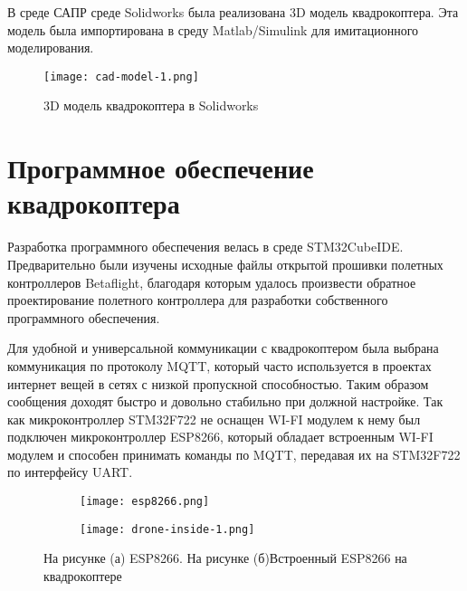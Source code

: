 В среде САПР среде Solidworks была реализована 3D модель квадрокоптера. Эта модель была
импортирована в среду Matlab/Simulink для имитационного моделирования.

\begin{figure}[ht]
	\centering
	\texttt{[image: cad-model-1.png]}
	\caption{3D модель квадрокоптера в Solidworks}
	\label{}
\end{figure}

\section{Программное обеспечение квадрокоптера}

Разработка программного обеспечения велась в среде 
STM32CubeIDE. Предварительно были изучены исходные файлы открытой 
прошивки полетных контроллеров Betaflight, благодаря которым удалось произвести
обратное проектирование полетного контроллера для разработки собственного программного обеспечения\cite{Betaflight}.

Для удобной и универсальной коммуникации с квадрокоптером была выбрана коммуникация по 
протоколу MQTT, который часто используется в проектах интернет вещей в сетях 
с низкой пропускной способностью\cite{MQTT}. Таким образом сообщения доходят быстро и довольно стабильно
при должной настройке. Так как микроконтроллер STM32F722 не оснащен WI-FI модулем к нему 
был подключен микроконтроллер ESP8266, который обладает встроенным WI-FI модулем и способен 
принимать команды по MQTT, передавая их на STM32F722 по интерфейсу UART.

\begin{figure}[ht]
	\centering
\hspace*{\fill}%
	\begin{subfigure}[b]{0.49\textwidth}
        \centering
		\texttt{[image: esp8266.png]}
		\caption{}
		\label{fig:tiger1}
	\end{subfigure}
\hfill
	\begin{subfigure}[b]{0.49\textwidth}
        \centering
		\texttt{[image: drone-inside-1.png]}
        \caption{}
		\label{fig:tiger2}
	\end{subfigure}
\hspace*{\fill}%
	\caption{На рисунке (а) ESP8266. На рисунке (б)Встроенный ESP8266 на квадрокоптере}
	\label{fig:tiger}
\end{figure}

\newpage

